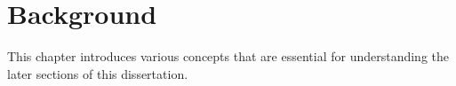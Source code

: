 \chapter{Background}\label{chap:background}

This chapter introduces various concepts that are essential for understanding the later sections of 
this dissertation.
